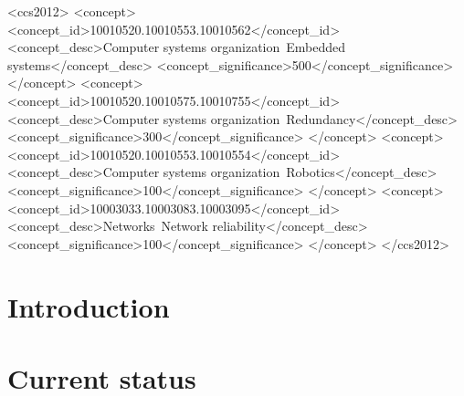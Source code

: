 \documentclass{sig-alternate}
\begin{document}
%
%
\begin{CCSXML}
<ccs2012>
 <concept>
  <concept_id>10010520.10010553.10010562</concept_id>
  <concept_desc>Computer systems organization~Embedded systems</concept_desc>
  <concept_significance>500</concept_significance>
 </concept>
 <concept>
  <concept_id>10010520.10010575.10010755</concept_id>
  <concept_desc>Computer systems organization~Redundancy</concept_desc>
  <concept_significance>300</concept_significance>
 </concept>
 <concept>
  <concept_id>10010520.10010553.10010554</concept_id>
  <concept_desc>Computer systems organization~Robotics</concept_desc>
  <concept_significance>100</concept_significance>
 </concept>
 <concept>
  <concept_id>10003033.10003083.10003095</concept_id>
  <concept_desc>Networks~Network reliability</concept_desc>
  <concept_significance>100</concept_significance>
 </concept>
</ccs2012>
\end{CCSXML}



%
%
\printccsdesc


\section{Introduction}


\section{Current status}
\end{document}
